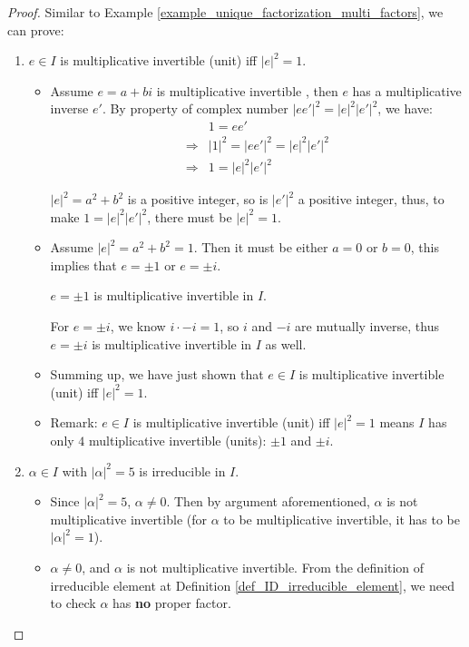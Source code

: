 \documentclass[utf8]{ctexbook}
\theoremstyle{definition}
\begin{document}
\begin{proof}
Similar to Example \ref{example_unique_factorization_multi_factors}, we can prove:
\begin{enumerate}
\item{$ e \in I$ is multiplicative invertible (unit) iff $|e|^2 = 1$.}

\begin{itemize}
\item{Assume $e = a + b i$ is multiplicative invertible , then $e$ has a multiplicative inverse $e'$. By property of complex number $|e e'|^2 = |e|^2 |e'|^2$, we have:
\begin{align*}
& 1 = e e' \\
\Longrightarrow & |1 |^2 = |e e'|^2 =  |e|^2 |e'|^2 \\
\Longrightarrow & 1 = |e|^2 |e'|^2
\end{align*}

$|e|^2 = a^2 + b^2$ is a positive integer, so is $|e'|^2$ a positive integer, thus, to make $1 = |e|^2 |e'|^2$, there must be $|e|^2 =1 $.
}
\item{Assume $|e|^2 = a^2 + b^2 = 1$. Then it must be either $a=0$ or $b = 0$, this implies that $e = \pm 1$ or $e = \pm i$.

$e = \pm 1$ is multiplicative invertible in $I$. 

For $e = \pm i$, we know $i \cdot - i = 1$, so $i$ and $-i$ are mutually inverse, thus $e = \pm i$ is multiplicative invertible in $I$ as well.}
\item{Summing up, we have just shown that $ e \in I$ is multiplicative invertible (unit) iff $|e|^2 = 1$.}
\item{Remark: $e \in I$ is multiplicative invertible (unit) iff $|e|^2 = 1$ means $I$ has only $4$ multiplicative invertible (units): $\pm 1$ and $\pm i$.}
\end{itemize}


\item{$\alpha \in I$ with $|\alpha|^2 = 5$ is irreducible in $I$.}

\begin{itemize}
\item{Since $|\alpha|^2 = 5$, $\alpha \neq 0$. Then by argument aforementioned, $\alpha$ is not multiplicative invertible (for $\alpha$ to be multiplicative invertible, it has to be $|\alpha|^2 = 1$). }
\item{$\alpha \neq 0$, and $\alpha$ is not multiplicative invertible. From the definition of irreducible element at Definition \ref{def_ID_irreducible_element}, we need to check $\alpha$ has \textbf{no} proper factor.

}
\end{itemize}
\end{enumerate}
\end{proof}
\end{document}

